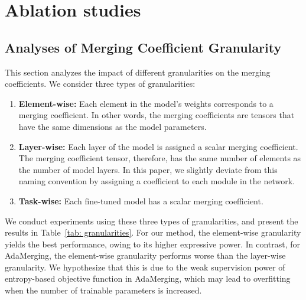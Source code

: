 \section{Ablation studies}
\label{apx: ablations}


\subsection{Analyses of Merging Coefficient Granularity}
\label{apx: granularity}
This section analyzes the impact of different granularities on the merging coefficients.  We consider three types of granularities:
\begin{enumerate} 
\item \textbf{Element-wise:} Each element in the model's weights corresponds to a merging coefficient. In other words, the merging coefficients are tensors that have the same dimensions as the model parameters. 
\item \textbf{Layer-wise:} Each layer of the model is assigned a scalar merging coefficient. The merging coefficient tensor, therefore, has the same number of elements as the number of model layers. In this paper, we slightly deviate from this naming convention by assigning a coefficient to each module in the network. 
\item \textbf{Task-wise:} Each fine-tuned model has a scalar merging coefficient. 
\end{enumerate}

We conduct experiments using these three types of granularities, and present the results in Table~\ref{tab: granularities}. For our method, the element-wise granularity yields the best performance, owing to its higher expressive power. In contrast, for AdaMerging, the element-wise granularity performs worse than the layer-wise granularity. We hypothesize that this is due to the weak supervision power of entropy-based objective function in AdaMerging, which may lead to overfitting when the number of trainable parameters is increased.


